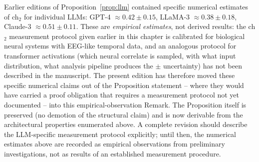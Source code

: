 \begin{remark}\label{rem:llm-ch2-methodology}
Earlier editions of Proposition~\ref{prop:llm} contained specific numerical estimates of ch$_2$ for individual LLMs: GPT-4 $\approx 0.42 \pm 0.15$, LLaMA-3 $\approx 0.38 \pm 0.18$, Claude-3 $\approx 0.51 \pm 0.11$. These are \emph{empirical estimates}, not derived results: the ch$_2$ measurement protocol given earlier in this chapter is calibrated for biological neural systems with EEG-like temporal data, and an analogous protocol for transformer activations (which neural correlate is sampled, with what input distribution, what analysis pipeline produces the $\pm$ uncertainty) has not been described in the manuscript. The present edition has therefore moved these specific numerical claims out of the Proposition statement -- where they would have carried a proof obligation that requires a measurement protocol not yet documented -- into this empirical-observation Remark. The Proposition itself is preserved (no demotion of the structural claim) and is now derivable from the architectural properties enumerated above. A complete revision should describe the LLM-specific measurement protocol explicitly; until then, the numerical estimates above are recorded as empirical observations from preliminary investigations, not as results of an established measurement procedure.
\end{remark}

